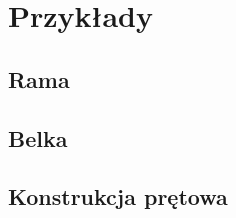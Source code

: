 \newpage
%
\newpage
\section{Przykłady}
\subsection{Rama}

\newpage
\subsection{Belka}

\newpage
\subsection{Konstrukcja prętowa}

